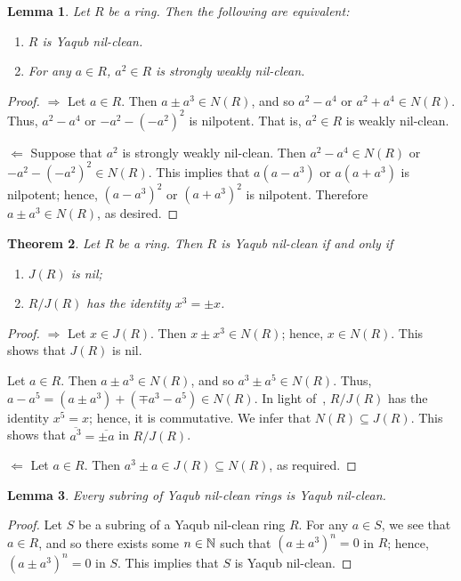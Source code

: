 \documentclass[12pt, reqno]{amsart}
\newtheorem{thm}{Theorem}[section]
\newtheorem{lem}[thm]{Lemma}
\numberwithin{equation}{section}
\begin{document}
\begin{lem} Let $R$ be a ring. Then the following are equivalent:
\end{lem}
\begin{enumerate}
\item [(1)] {\it $R$ is Yaqub nil-clean.}
\vspace{-.5mm}
\item [(2)] {\it For any $a\in R$, $a^2\in R$ is strongly weakly nil-clean.}
\end{enumerate}
\begin{proof} $\Longrightarrow$ Let $a\in R$. Then $a\pm a^3\in N(R)$, and so $a^2-a^4$ or $a^2+a^4\in N(R)$. Thus, $a^2-a^4$ or $-a^2-(-a^2)^2$ is nilpotent. That is, $a^2\in R$ is weakly nil-clean.

$\Longleftarrow$ Suppose that $a^2$ is strongly weakly nil-clean. Then $a^2-a^4\in N(R)$ or $-a^2-(-a^2)^2\in N(R)$. This implies that
$a(a-a^3)$ or $a(a+a^3)$ is nilpotent; hence, $(a-a^3)^2$ or $(a+a^3)^2$ is nilpotent. Therefore $a\pm a^3\in N(R)$, as desired.\end{proof}

\begin{thm} Let $R$ be a ring. Then $R$ is Yaqub nil-clean if and only if
\end{thm}
\begin{enumerate}
\item [(1)] {\it $J(R)$ is nil;}
\vspace{-.5mm}
\item [(2)] {\it $R/J(R)$ has the identity $x^3=\pm x$.}
\end{enumerate}
\begin{proof} $\Longrightarrow$ Let $x\in J(R)$. Then $x\pm x^3\in N(R)$; hence, $x\in N(R)$. This shows that $J(R)$ is nil.

Let $a\in R$. Then $a\pm a^3\in N(R)$, and so $a^3\pm a^5\in N(R)$.
Thus, $a-a^5=(a\pm a^3)+(\mp a^3-a^5)\in N(R)$. In light of~\cite[Theorem 2.11]{Z}, $R/J(R)$ has the identity $x^5=x$; hence, it is commutative. We infer that
$N(R)\subseteq J(R)$. This shows that
$\overline{a^3}=\overline{\pm a}$ in $R/J(R)$.

$\Longleftarrow $ Let $a\in R$. Then $a^3\pm a\in J(R)\subseteq N(R)$, as required.\end{proof}

\begin{lem} Every subring of Yaqub nil-clean rings is Yaqub nil-clean.
\end{lem}
\begin{proof} Let $S$ be a subring of a Yaqub nil-clean ring $R$. For any $a\in S$, we see that $a\in R$, and so there exists some $n\in {\Bbb N}$ such that $(a\pm a^3)^n=0$ in $R$; hence, $(a\pm a^3)^n=0$ in $S$. This implies that $S$ is Yaqub nil-clean.\end{proof}
\end{document}
